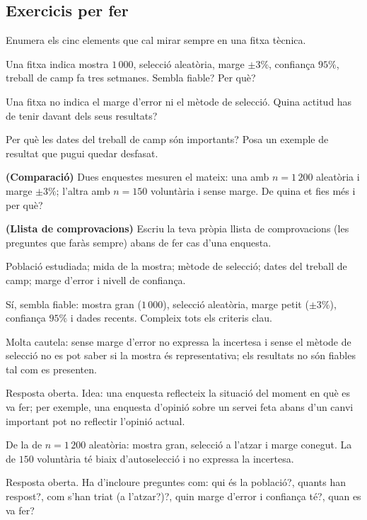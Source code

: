 \subsection{Exercicis per fer}

\begin{exercicis}
\begin{exlist}
  \item Enumera els cinc elements que cal mirar sempre en una fitxa tècnica.
  \item Una fitxa indica mostra $1\,000$, selecció aleatòria, marge $\pm 3\%$, confiança
        $95\%$, treball de camp fa tres setmanes. Sembla fiable? Per què?
  \item Una fitxa no indica el marge d'error ni el mètode de selecció. Quina actitud has de
        tenir davant dels seus resultats?
  \item Per què les dates del treball de camp són importants? Posa un exemple de resultat
        que pugui quedar desfasat.
  \item \textbf{(Comparació)} Dues enquestes mesuren el mateix: una amb $n=1\,200$
        aleatòria i marge $\pm 3\%$; l'altra amb $n=150$ voluntària i sense marge. De
        quina et fies més i per què?
  \item \textbf{(Llista de comprovacions)} Escriu la teva pròpia llista de comprovacions
        (les preguntes que faràs sempre) abans de fer cas d'una enquesta.
\end{exlist}
\end{exercicis}

\begin{solucions}
\begin{sollist}
  \item Població estudiada; mida de la mostra; mètode de selecció; dates del treball de
        camp; marge d'error i nivell de confiança.
  \item Sí, sembla fiable: mostra gran ($1\,000$), selecció aleatòria, marge petit
        ($\pm 3\%$), confiança $95\%$ i dades recents. Compleix tots els criteris clau.
  \item Molta cautela: sense marge d'error no expressa la incertesa i sense el mètode de
        selecció no es pot saber si la mostra és representativa; els resultats no són
        fiables tal com es presenten.
  \item Resposta oberta. Idea: una enquesta reflecteix la situació del moment en què es va
        fer; per exemple, una enquesta d'opinió sobre un servei feta abans d'un canvi
        important pot no reflectir l'opinió actual.
  \item De la de $n=1\,200$ aleatòria: mostra gran, selecció a l'atzar i marge conegut. La
        de $150$ voluntària té biaix d'autoselecció i no expressa la incertesa.
  \item Resposta oberta. Ha d'incloure preguntes com: qui és la població?, quants han
        respost?, com s'han triat (a l'atzar?)?, quin marge d'error i confiança té?, quan
        es va fer?
\end{sollist}
\end{solucions}
